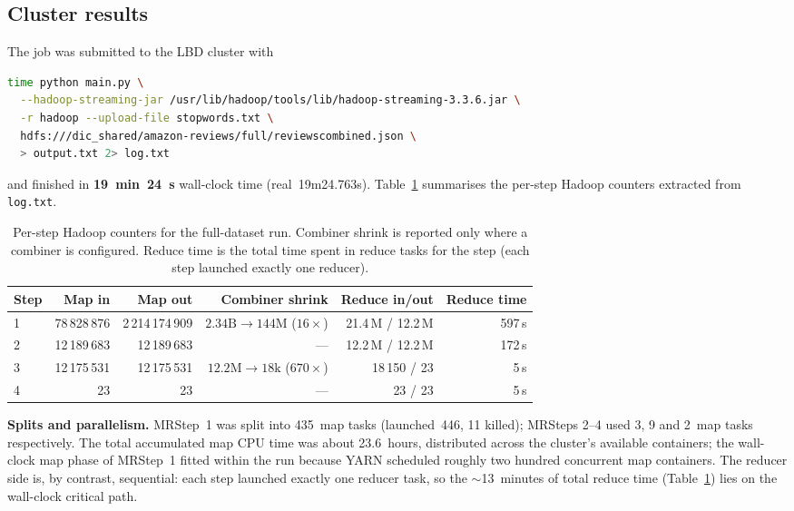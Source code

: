 \documentclass[11pt,a4paper]{article}
\begin{document}
\subsection{Cluster results}
\label{sec:results}

The job was submitted to the LBD cluster with

\begin{lstlisting}[language=bash]
time python main.py \
  --hadoop-streaming-jar /usr/lib/hadoop/tools/lib/hadoop-streaming-3.3.6.jar \
  -r hadoop --upload-file stopwords.txt \
  hdfs:///dic_shared/amazon-reviews/full/reviewscombined.json \
  > output.txt 2> log.txt
\end{lstlisting}

and finished in \textbf{19~min~24~s} wall-clock time
(real~19m24.763s).  Table~\ref{tab:counters} summarises the
per-step Hadoop counters extracted from \texttt{log.txt}.

\begin{table}[h]
\centering
\small
\begin{tabular}{lrrrrr}
\toprule
Step & Map in & Map out & Combiner shrink & Reduce in/out & Reduce time \\
\midrule
1 & 78\,828\,876 & 2\,214\,174\,909 & $2.34\text{B}\!\to\!144\text{M}$ ($16\times$) & 21.4\,M / 12.2\,M & 597\,s \\
2 & 12\,189\,683 & 12\,189\,683    & ---                                & 12.2\,M / 12.2\,M & 172\,s \\
3 & 12\,175\,531 & 12\,175\,531    & $12.2\text{M}\!\to\!18\text{k}$ ($670\times$) & 18\,150 / 23 &   5\,s \\
4 &           23 &            23  & ---                                &     23 / 23  &   5\,s \\
\bottomrule
\end{tabular}
\caption{Per-step Hadoop counters for the full-dataset run. Combiner shrink
is reported only where a combiner is configured. Reduce time is the total
time spent in reduce tasks for the step (each step launched exactly one
reducer).}
\label{tab:counters}
\end{table}

\textbf{Splits and parallelism.} MRStep~1 was split into 435~map tasks
(launched~446, 11 killed); MRSteps 2--4 used 3, 9 and 2~map tasks
respectively. The total accumulated map CPU time was about 23.6~hours,
distributed across the cluster's available containers; the wall-clock map
phase of MRStep~1 fitted within the run because YARN scheduled roughly two
hundred concurrent map containers. The reducer side is, by contrast,
sequential: each step launched exactly one reducer task, so the
$\sim$13~minutes of total reduce time (Table~\ref{tab:counters}) lies on
the wall-clock critical path.
\end{document}
